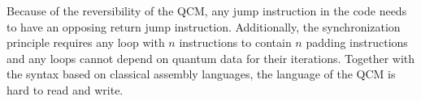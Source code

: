 Because of the reversibility of the QCM, any jump instruction in the code needs to have an opposing return jump instruction. Additionally, the synchronization principle requires any loop with $n$ instructions to contain $n$ padding instructions and any loops cannot depend on quantum data for their iterations. 
Together with the syntax based on classical assembly languages, the language of the QCM is hard to read and write. 

